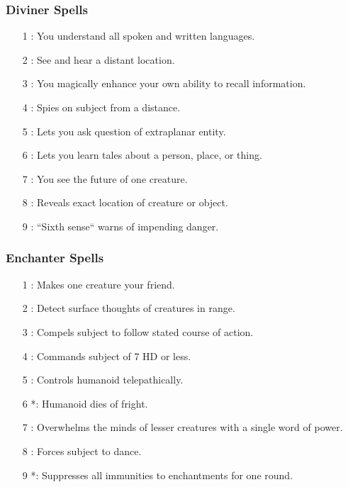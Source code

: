 \subsubsection{Diviner Spells}
\begin{itemize}
\item[1] : You understand all spoken and written languages.
\item[2] : See and hear a distant location.
\item[3] : You magically enhance your own ability to recall information.
\item[4] : Spies on subject from a distance.
\item[5] : Lets you ask question of extraplanar entity.
\item[6] : Lets you learn tales about a person, place, or thing.
\item[7] : You see the future of one creature.
\item[8] : Reveals exact location of creature or object.
\item[9] : ``Sixth sense`` warns of impending danger.
\end{itemize}
\subsubsection{Enchanter Spells}
\begin{itemize}
\item[1] : Makes one creature your friend.
\item[2] : Detect surface thoughts of creatures in range.
\item[3] : Compels subject to follow stated course of action.
\item[4] : Commands subject of 7 HD or less.
\item[5] : Controls humanoid telepathically.
\item[6] *: Humanoid dies of fright.
\item[7] : Overwhelms the minds of lesser creatures with a single word of power.
\item[8] : Forces subject to dance.
\item[9] *: Suppresses all immunities to enchantments for one round.
\end{itemize}
